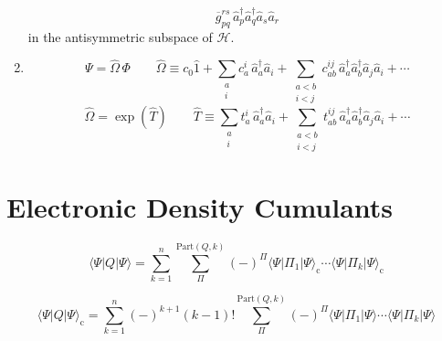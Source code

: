 \begin{enumerate}
\begin{equation}
            \overline{g}_{pq}^{rs}\,
            \hat{a}_p^\dagger
            \hat{a}_q^\dagger
            \hat{a}_s
            \hat{a}_r
        \end{equation}
        in the antisymmetric subspace of \(\mathcal{H}\).
    \item
        \begin{equation}
            \Psi
            =
            \hat{\Omega}\,
            \Phi
            \qquad
            \hat{\Omega}
            \equiv
            c_0
            \hat{1}
            +
            \sum_{\substack{a\\i}}
            c_a^i\,
            \hat{a}_a^\dagger
            \hat{a}_i
            +
            \sum_{\substack{a<b\\i<j}}
            c_{ab}^{ij}\,
            \hat{a}_a^\dagger
            \hat{a}_b^\dagger
            \hat{a}_j
            \hat{a}_i
            +
            \cdots
        \end{equation}
        \begin{equation}
            \hat{\Omega}
            =
            \exp(\hat{T})
            \qquad
            \hat{T}
            \equiv
            \sum_{\substack{a\\i}}
            t_a^i\,
            \hat{a}_a^\dagger
            \hat{a}_i
            +
            \sum_{\substack{a<b\\i<j}}
            t_{ab}^{ij}\,
            \hat{a}_a^\dagger
            \hat{a}_b^\dagger
            \hat{a}_j
            \hat{a}_i
            +
            \cdots
        \end{equation}
\end{enumerate}



\section{Electronic Density Cumulants}

\begin{equation}
    \langle\Psi|Q|\Psi\rangle
    =
    \sum_{k=1}^n
    \sum_{\Pi}^{\mathrm{Part}(Q, k)}
    (-)^{\Pi}
    \langle\Psi|\Pi_1|\Psi\rangle_\mathrm{c}
    \cdots
    \langle\Psi|\Pi_k|\Psi\rangle_\mathrm{c}
\end{equation}

\begin{equation}
    \langle\Psi|Q|\Psi\rangle_\mathrm{c}
    =
    \sum_{k=1}^n
    (-)^{k+1}
    (k-1)!
    \sum_{\Pi}^{\mathrm{Part}(Q, k)}
    (-)^{\Pi}
    \langle\Psi|\Pi_1|\Psi\rangle
    \cdots
    \langle\Psi|\Pi_k|\Psi\rangle
\end{equation}


